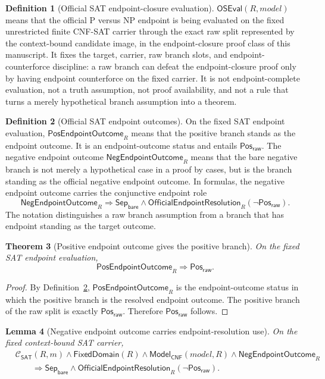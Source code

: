 \documentclass[11pt]{article}
\newtheorem{theorem}{Theorem}[section]
\newtheorem{lemma}[theorem]{Lemma}
\theoremstyle{definition}
\newtheorem{definition}[theorem]{Definition}
\theoremstyle{remark}
\newcommand{\PosRaw}{\mathsf{Pos}_{\mathsf{raw}}}
\newcommand{\SepBare}{\mathsf{Sep}_{\mathsf{bare}}}
\newcommand{\ClayCtx}{\mathcal{C}_{\mathsf{SAT}}(R,m)}
\newcommand{\FixedDom}{\mathsf{FixedDomain}}
\newcommand{\OfficialEndpointResolution}{\mathsf{OfficialEndpointResolution}}
\newcommand{\ModelOfCnf}{\mathsf{Model}_{\mathsf{CNF}}}
\newcommand{\OfficialSATEval}{\mathsf{OSEval}}
\newcommand{\PosEndpointOutcome}{\mathsf{PosEndpointOutcome}}
\newcommand{\NegEndpointOutcome}{\mathsf{NegEndpointOutcome}}
\begin{document}
\begin{definition}[Official SAT endpoint-closure evaluation]
\label{def:official-sat-endpoint-evaluation}
\(\OfficialSATEval(R,model)\) means that the official P versus NP endpoint is being evaluated on the fixed unrestricted finite CNF-SAT carrier through the exact raw split represented by the context-bound candidate image, in the endpoint-closure proof class of this manuscript. It fixes the target, carrier, raw branch slots, and endpoint-counterforce discipline: a raw branch can defeat the endpoint-closure proof only by having endpoint counterforce on the fixed carrier. It is not endpoint-complete evaluation, not a truth assumption, not proof availability, and not a rule that turns a merely hypothetical branch assumption into a theorem.
\end{definition}

\begin{definition}[Official SAT endpoint outcomes]
\label{def:official-sat-endpoint-outcomes}
On the fixed SAT endpoint evaluation, \(\PosEndpointOutcome_R\) means that the positive branch stands as the endpoint outcome. It is an endpoint-outcome status and entails \(\PosRaw\). The negative endpoint outcome \(\NegEndpointOutcome_R\) means that the bare negative branch is not merely a hypothetical case in a proof by cases, but is the branch standing as the official negative endpoint outcome. In formulas, the negative endpoint outcome carries the conjunctive endpoint role
\[
  \NegEndpointOutcome_R \Rightarrow \SepBare\wedge\OfficialEndpointResolution_R(\neg\PosRaw).
\]
The notation distinguishes a raw branch assumption from a branch that has endpoint standing as the target outcome.
\end{definition}

\begin{theorem}[Positive endpoint outcome gives the positive branch]
\label{thm:positive-outcome-gives-posraw}
On the fixed SAT endpoint evaluation,
\[
  \PosEndpointOutcome_R\Rightarrow\PosRaw.
\]
\end{theorem}

\begin{proof}
By Definition~\ref{def:official-sat-endpoint-outcomes}, \(\PosEndpointOutcome_R\) is the endpoint-outcome status in which the positive branch is the resolved endpoint outcome. The positive branch of the raw split is exactly \(\PosRaw\). Therefore \(\PosRaw\) follows.
\end{proof}

\begin{lemma}[Negative endpoint outcome carries endpoint-resolution use]
\label{lem:official-evaluation-negative-branch-endpoint-use}
On the fixed context-bound SAT carrier,
\[
\begin{aligned}
  &\ClayCtx\wedge\FixedDom(R)\wedge\ModelOfCnf(model,R)\wedge\NegEndpointOutcome_R\\
  &\qquad\Rightarrow \SepBare\wedge\OfficialEndpointResolution_R(\neg\PosRaw).
\end{aligned}
\]
\end{lemma}
\end{document}
